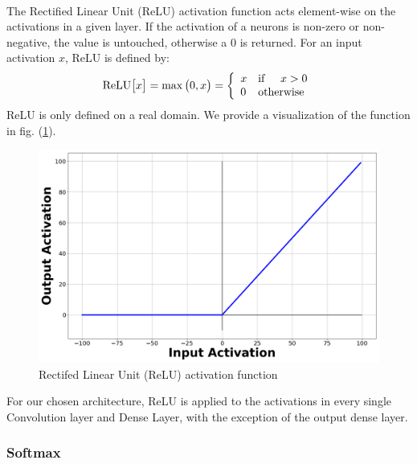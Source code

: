 \documentclass[12pt,letterpaper]{article}
\begin{document}
\paragraph*{}The Rectified Linear Unit (ReLU) activation function acts element-wise on the activations in a given layer. If the activation of a neurons is non-zero or non-negative, the value is untouched, otherwise a $0$ is returned. For an input activation $x$, ReLU is defined by:
\begin{equation}
\label{eqn-ReLU}
\text{ReLU}\big[x\big] = \max\big(0,x\big) = \left\{
\begin{array}{ll}
    x & \text{if\hspace{0.5cm}} x > 0 \\
    0 & \text{otherwise}
\end{array} 
\right.
\end{equation}
ReLU is only defined on a real domain. We provide a visualization of the function in fig. (\ref{fig-ReLU}).
\begin{figure}[H]
\label{fig-ReLU}
\begin{center}
\includegraphics[scale=0.2]{../Figures/RectifiedLinearUnit}
\end{center}
\caption{Rectifed Linear Unit (ReLU) activation function}
\end{figure}
For our chosen architecture, ReLU is applied to the activations in every single Convolution layer and Dense Layer, with the exception of the output dense layer.


\subsubsection{Softmax}
\end{document}
